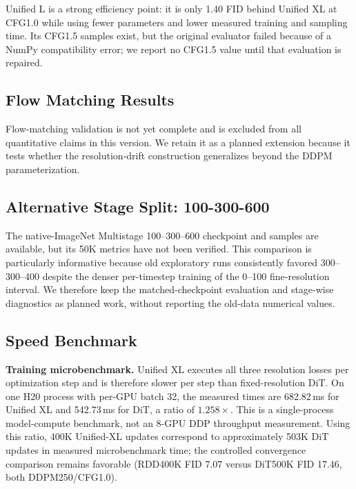 \documentclass[10pt]{article}
\begin{document}
Unified L is a strong efficiency point: it is only 1.40 FID behind Unified XL at CFG1.0 while using fewer parameters and lower measured training and sampling time.
Its CFG1.5 samples exist, but the original evaluator failed because of a NumPy compatibility error; we report no CFG1.5 value until that evaluation is repaired.

\subsection{Flow Matching Results}
\label{sec:fm_results}


Flow-matching validation is not yet complete and is excluded from all quantitative claims in this version.
We retain it as a planned extension because it tests whether the resolution-drift construction generalizes beyond the DDPM parameterization.

\subsection{Alternative Stage Split: 100-300-600}
\label{sec:alt_split}

The native-ImageNet Multistage 100--300--600 checkpoint and samples are available, but its 50K metrics have not been verified.
This comparison is particularly informative because old exploratory runs consistently favored 300--300--400 despite the denser per-timestep training of the 0--100 fine-resolution interval.
We therefore keep the matched-checkpoint evaluation and stage-wise diagnostics as planned work, without reporting the old-data numerical values.

\subsection{Speed Benchmark}
\label{sec:speed}

\textbf{Training microbenchmark.}
Unified XL executes all three resolution losses per optimization step and is therefore slower per step than fixed-resolution DiT.
On one H20 process with per-GPU batch 32, the measured times are 682.82\,ms for Unified XL and 542.73\,ms for DiT, a ratio of $1.258\times$.
This is a single-process model-compute benchmark, not an 8-GPU DDP throughput measurement.
Using this ratio, 400K Unified-XL updates correspond to approximately 503K DiT updates in measured microbenchmark time; the controlled convergence comparison remains favorable (RDD400K FID 7.07 versus DiT500K FID 17.46, both DDPM250/CFG1.0).
\end{document}
